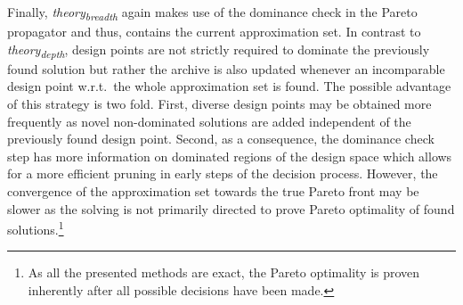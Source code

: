Finally, \emph{theory\textsubscript{breadth}} again makes use of the dominance check in the Pareto propagator and thus, contains the current approximation set. In contrast to \emph{theory\textsubscript{depth}}, design points are not strictly required to dominate the previously found solution but rather the archive is also updated whenever an incomparable design point w.r.t.~the whole approximation set is found. The possible advantage of this strategy is two fold. First, diverse design points may be obtained more frequently as novel non-dominated solutions are added independent of the previously found design point. Second, as a consequence, the dominance check step has more information on dominated regions of the design space which allows for a more efficient pruning in early steps of the decision process. However, the convergence of the approximation set towards the true Pareto front may be slower as the solving is not primarily directed to prove Pareto optimality of found solutions.\footnote{As all the presented methods are exact, the Pareto optimality is proven inherently after all possible decisions have been made.} 
